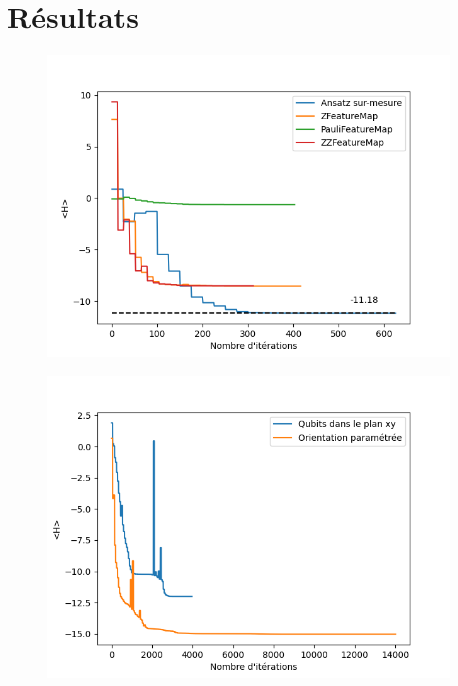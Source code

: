 \documentclass{subfiles}[../main.tex]
\begin{document}
\section{Résultats}

\begin{figure}
    \begin{center}
        \includegraphics[width=0.95\textwidth]{../figs/convergence.png}
    \end{center}
    \caption{}
    \label{fig:}
\end{figure}


\begin{figure}
    \begin{center}
        \includegraphics[width=0.95\textwidth]{../figs/convergence_upgrade.png}
    \end{center}
    \caption{}
    \label{fig:}
\end{figure}
\end{document}
